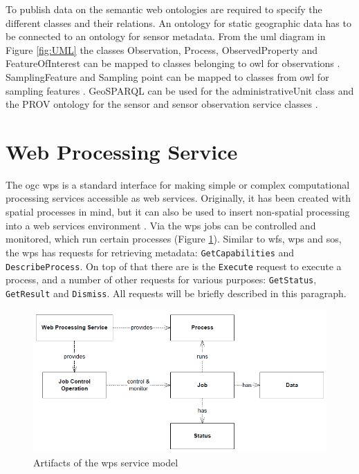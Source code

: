 To publish data on the semantic web ontologies are required to specify the different classes and their relations. An ontology for static geographic data has to be connected to an ontology for sensor metadata. From the \ac{uml} diagram in Figure \ref{fig:UML} the classes Observation, Process, ObservedProperty and FeatureOfInterest can be mapped to classes belonging to \ac{owl} for observations \citep{SSW:Cox}. SamplingFeature and Sampling point can be mapped to classes from \ac{owl} for sampling features \citep{SSW:Cox2}. GeoSPARQL can be used for the administrativeUnit class \citep{LD:OGC} and the PROV ontology for the sensor and sensor observation service classes \citep{LD:W3C2}. 


\section{Web Processing Service}
The \ac{ogc} \acl{wps} is a standard interface for making simple or complex computational processing services accessible as web services. Originally, it has been created with spatial processes in mind, but it can also be used to insert non-spatial processing into a web services environment \citep[p. 8]{GEO:OGC}. Via the \ac{wps} jobs can be controlled and monitored, which run certain processes (Figure \ref{fig:WPSmodel}). Similar to \ac{wfs}, \ac{wps} and \ac{sos}, the \ac{wps} has requests for retrieving metadata: \texttt{GetCapabilities} and \texttt{DescribeProcess}. On top of that there are is the \texttt{Execute} request to execute a process, and a number of other requests for various purposes: \texttt{GetStatus}, \texttt{GetResult} and \texttt{Dismiss}. All requests will be briefly described in this paragraph.  

\begin{figure}
	\centering
	\includegraphics[width=1\linewidth]{UML/WPSmodel.png}
	\caption{Artifacts of the \ac{wps} service model \citep[p. 15]{GEO:OGC}}
	\label{fig:WPSmodel}
\end{figure}

